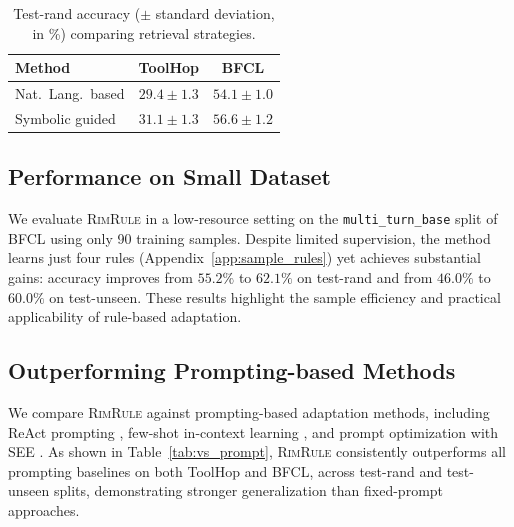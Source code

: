 \documentclass[11pt]{article}
\newcommand{\rand}{{test-rand}\xspace}
\newcommand{\unseen}{{test-unseen}\xspace}
\newcommand{\shortname}{\textsc{RimRule}\xspace}
\begin{document}



\begin{table}[t]
\small
\caption{Test-rand accuracy ($\pm$ standard deviation, in \%) comparing retrieval strategies.}
\vspace{0.5em}
\label{tab:retriever}
\centering
\renewcommand{\arraystretch}{1.25}
\begin{tabular}{@{}lcc@{}}
\toprule
\textbf{Method} & \textbf{ToolHop} & \textbf{BFCL} \\
\midrule
Nat.\ Lang.\ based 
& $29.4 \scriptstyle \pm 1.3$ 
& $54.1 \scriptstyle \pm 1.0$ \\
Symbolic guided 
& $\mathbf{31.1} \scriptstyle \pm 1.3$ 
& $\mathbf{56.6} \scriptstyle \pm 1.2$ \\
\bottomrule
\end{tabular}
\end{table}




\subsection{Performance on Small Dataset}

We evaluate \shortname in a low-resource setting on the \texttt{multi\_turn\_base} split of
BFCL using only 90 training samples. Despite limited supervision, the method learns just
four rules (Appendix~\ref{app:sample_rules}) yet achieves substantial gains: accuracy
improves from $55.2\%$ to $62.1\%$ on \rand and from $46.0\%$ to $60.0\%$ on \unseen. These
results highlight the sample efficiency and practical applicability of rule-based
adaptation.





\subsection{Outperforming Prompting-based Methods}

We compare \shortname against prompting-based adaptation methods, including ReAct
prompting \citep{yao2023react}, few-shot in-context learning \citep{yizhe2021fewshot}, and prompt optimization with SEE \citep{cui2025see}.
As shown in Table~\ref{tab:vs_prompt}, \shortname consistently outperforms all prompting
baselines on both ToolHop and BFCL, across \rand and \unseen splits, demonstrating stronger
generalization than fixed-prompt approaches.
\end{document}

